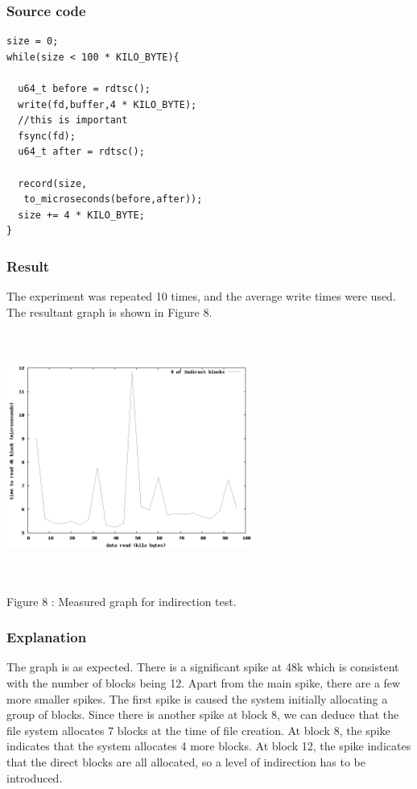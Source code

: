 \documentclass[twocolumn,11pt]{article}
\newcommand{\chumma}[1]{\subsubsection {#1}}
\begin{document}
\begin{sloppypar}
\chumma{Source code}
\begin{lstlisting}[frame=single]
size = 0;
while(size < 100 * KILO_BYTE){

  u64_t before = rdtsc();
  write(fd,buffer,4 * KILO_BYTE);
  //this is important
  fsync(fd);
  u64_t after = rdtsc();
  
  record(size,
   to_microseconds(before,after));
  size += 4 * KILO_BYTE;
}
\end{lstlisting}

\chumma{Result}

The experiment was repeated 10 times, and the average write times
were used. The resultant graph is shown in Figure 8.

\includegraphics[width=230pt,height=230pt]{indirection.png}
\begin{center}
Figure 8 : Measured graph for indirection test.
\end{center}

\chumma{Explanation}

The graph is as expected. There is a significant spike at 48k which
is consistent with the number of blocks being 12. Apart from the main
spike, there are a few more smaller spikes. The first spike is caused
the system initially allocating a group of blocks. Since there is another
spike at block 8, we can deduce that the file system allocates 7 blocks
at the time of file creation. At block 8, the spike indicates that the
system allocates 4 more blocks. At block 12, the spike indicates that the
direct blocks are all allocated, so a level of indirection has to be
introduced.


\end{sloppypar}
\end{document}
